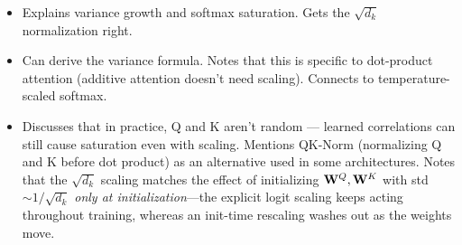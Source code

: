 \begin{interviewq}
\goodgreat
\begin{itemize}
    \item {} Explains variance growth and softmax saturation. Gets the $\sqrt{d_k}$ normalization right.
    \item {} Can derive the variance formula. Notes that this is specific to dot-product attention (additive attention doesn't need scaling). Connects to temperature-scaled softmax.
    \item {} Discusses that in practice, Q and K aren't random --- learned correlations can still cause saturation even with scaling. Mentions QK-Norm (normalizing Q and K before dot product) as an alternative used in some architectures. Notes that the $\sqrt{d_k}$ scaling matches the effect of initializing $\mathbf{W}^Q, \mathbf{W}^K$ with std $\sim 1/\sqrt{d_k}$ \textit{only at initialization}---the explicit logit scaling keeps acting throughout training, whereas an init-time rescaling washes out as the weights move.
\end{itemize}

\end{interviewq}


